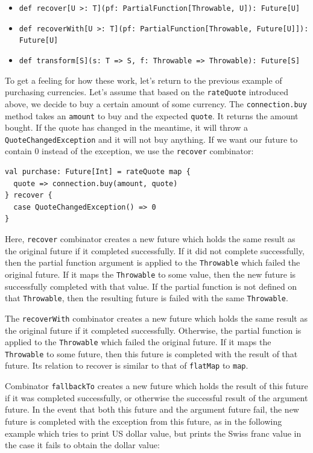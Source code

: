 \begin{itemize}
  \itemsep0em
  \item \verb|def recover[U >: T](pf: PartialFunction[Throwable, U]): Future[U]|
  \item \verb|def recoverWith[U >: T](pf: PartialFunction[Throwable, Future[U]]): Future[U]|
  \item \verb|def transform[S](s: T => S, f: Throwable => Throwable): Future[S]|
\end{itemize}

To get a feeling for how these work, let's return to the previous example of
purchasing currencies. Let's assume that based on the \verb|rateQuote|
introduced above, we decide to buy a certain amount of some currency. The
\verb|connection.buy| method takes an \verb|amount| to buy and the expected
\verb|quote|. It returns the amount bought. If the quote has changed in the
meantime, it will throw a \verb|QuoteChangedException| and it will not buy
anything. If we want our future to contain 0 instead of the exception, we use
the \verb|recover| combinator:

\begin{verbatim}
val purchase: Future[Int] = rateQuote map {
  quote => connection.buy(amount, quote)
} recover {
  case QuoteChangedException() => 0
}
\end{verbatim}

Here, \verb|recover| combinator creates a new future which holds the same result
as the original future if it completed successfully. If it did not complete
successfully, then the partial function argument is applied to the
\verb|Throwable| which failed the original future. If it maps the
\verb|Throwable| to some value, then the new future is successfully completed
with that value. If the partial function is not defined on that
\verb|Throwable|, then the resulting future is failed with the same
\verb|Throwable|.

The \verb|recoverWith| combinator creates a new future which holds the same
result as the original future if it completed successfully. Otherwise, the
partial function is applied to the \verb|Throwable| which failed the original
future. If it maps the \verb|Throwable| to some future, then this future is
completed with the result of that future. Its relation to recover is similar to
that of \verb|flatMap| to \verb|map|.

Combinator \verb|fallbackTo| creates a new future which holds the result of this
future if it was completed successfully, or otherwise the successful result of
the argument future. In the event that both this future and the argument future
fail, the new future is completed with the exception from this future, as in the
following example which tries to print US dollar value, but prints the Swiss
franc value in the case it fails to obtain the dollar value:


